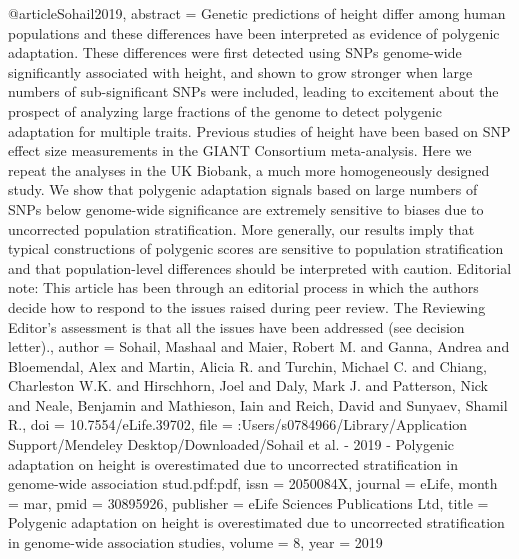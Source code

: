 @article{Sohail2019,
abstract = {Genetic predictions of height differ among human populations and these differences have been interpreted as evidence of polygenic adaptation. These differences were first detected using SNPs genome-wide significantly associated with height, and shown to grow stronger when large numbers of sub-significant SNPs were included, leading to excitement about the prospect of analyzing large fractions of the genome to detect polygenic adaptation for multiple traits. Previous studies of height have been based on SNP effect size measurements in the GIANT Consortium meta-analysis. Here we repeat the analyses in the UK Biobank, a much more homogeneously designed study. We show that polygenic adaptation signals based on large numbers of SNPs below genome-wide significance are extremely sensitive to biases due to uncorrected population stratification. More generally, our results imply that typical constructions of polygenic scores are sensitive to population stratification and that population-level differences should be interpreted with caution. Editorial note: This article has been through an editorial process in which the authors decide how to respond to the issues raised during peer review. The Reviewing Editor's assessment is that all the issues have been addressed (see decision letter).},
author = {Sohail, Mashaal and Maier, Robert M. and Ganna, Andrea and Bloemendal, Alex and Martin, Alicia R. and Turchin, Michael C. and Chiang, Charleston W.K. and Hirschhorn, Joel and Daly, Mark J. and Patterson, Nick and Neale, Benjamin and Mathieson, Iain and Reich, David and Sunyaev, Shamil R.},
doi = {10.7554/eLife.39702},
file = {:Users/s0784966/Library/Application Support/Mendeley Desktop/Downloaded/Sohail et al. - 2019 - Polygenic adaptation on height is overestimated due to uncorrected stratification in genome-wide association stud.pdf:pdf},
issn = {2050084X},
journal = {eLife},
month = {mar},
pmid = {30895926},
publisher = {eLife Sciences Publications Ltd},
title = {{Polygenic adaptation on height is overestimated due to uncorrected stratification in genome-wide association studies}},
volume = {8},
year = {2019}
}
